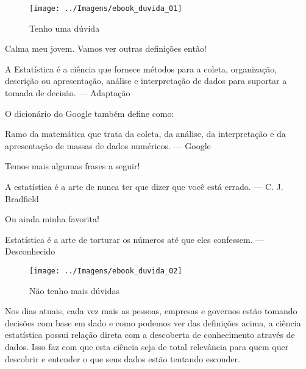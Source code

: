 \documentclass[12pt,]{style/krantz}
\renewenvironment{quote}{\begin{VF}}{\end{VF}}
\theoremstyle{definition}
\theoremstyle{definition}
\theoremstyle{definition}
\theoremstyle{remark}
\begin{document}
\begin{figure}[H]

{\centering \texttt{[image: ../Imagens/ebook\_duvida\_01]} 

}

\caption{Tenho uma dúvida}\label{fig:fig01}
\end{figure}

Calma meu jovem. Vamos ver outras definições então!

\begin{quote}
A Estatística é a ciência que fornece métodos para a coleta, organização, descrição ou apresentação, análise e interpretação de dados para suportar a tomada de decisão. --- Adaptação
\end{quote}

O dicionário do Google também define como:

\begin{quote}
Ramo da matemática que trata da coleta, da análise, da interpretação e da apresentação de massas de dados numéricos. --- Google
\end{quote}

Temos mais algumas frases a seguir!

\begin{quote}
A estatística é a arte de nunca ter que dizer que você está errado. --- C. J. Bradfield
\end{quote}

Ou ainda minha favorita!

\begin{quote}
Estatística é a arte de torturar os números até que eles confessem. --- Desconhecido
\end{quote}

\begin{figure}[H]

{\centering \texttt{[image: ../Imagens/ebook\_duvida\_02]} 

}

\caption{Não tenho mais dúvidas}\label{fig:fig02}
\end{figure}

Nos dias atuais, cada vez mais as pessoas, empresas e governos estão tomando decisões com base em dado e como podemos ver das definições acima, a ciência estatística possui relação direta com a descoberta de conhecimento através de dados. Isso faz com que esta ciência seja de total relevância para quem quer descobrir e entender o que seus dados estão tentando esconder.
\end{document}
